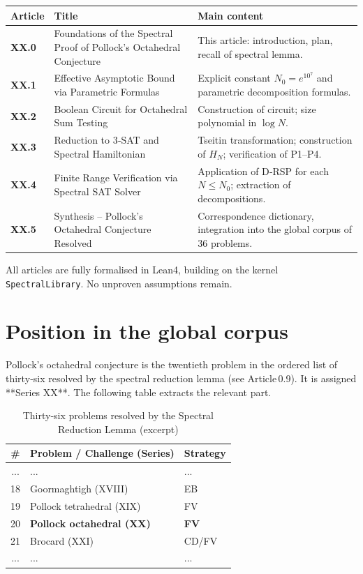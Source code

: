 \documentclass[11pt,a4paper]{article}
\begin{document}
\begin{center}
\small
\begin{tabular}{@{}>{\bfseries}l>{\raggedright\arraybackslash}p{4.5cm}>{\raggedright\arraybackslash}p{6cm}@{}}
\toprule
\textbf{Article} & \textbf{Title} & \textbf{Main content} \\
\midrule
XX.0 & Foundations of the Spectral Proof of Pollock's Octahedral Conjecture & This article: introduction, plan, recall of spectral lemma. \\
XX.1 & Effective Asymptotic Bound via Parametric Formulas & Explicit constant \(N_0 = e^{10^7}\) and parametric decomposition formulas. \\
XX.2 & Boolean Circuit for Octahedral Sum Testing & Construction of circuit; size polynomial in \(\log N\). \\
XX.3 & Reduction to 3‑SAT and Spectral Hamiltonian & Tseitin transformation; construction of \(H_N\); verification of P1–P4. \\
XX.4 & Finite Range Verification via Spectral SAT Solver & Application of D‑RSP for each \(N\le N_0\); extraction of decompositions. \\
XX.5 & Synthesis – Pollock's Octahedral Conjecture Resolved & Correspondence dictionary, integration into the global corpus of 36 problems. \\
\bottomrule
\end{tabular}
\end{center}

All articles are fully formalised in Lean4, building on the kernel \texttt{SpectralLibrary}. No unproven assumptions remain.

\section{Position in the global corpus}

Pollock's octahedral conjecture is the twentieth problem in the ordered list of thirty‑six resolved by the spectral reduction lemma (see Article 0.9). It is assigned **Series XX**. The following table extracts the relevant part.

\begin{center}
\small
\begin{longtable}{@{}cll@{}}
\caption{Thirty‑six problems resolved by the Spectral Reduction Lemma (excerpt)}\\
\toprule
\# & Problem / Challenge (Series) & Strategy \\
\midrule
... & ... & ... \\
18 & Goormaghtigh (XVIII) & EB \\
19 & Pollock tetrahedral (XIX) & FV \\
20 & \textbf{Pollock octahedral (XX)} & \textbf{FV} \\
21 & Brocard (XXI) & CD/FV \\
... & ... & ... \\
\bottomrule
\end{longtable}
\end{center}
\end{document}

